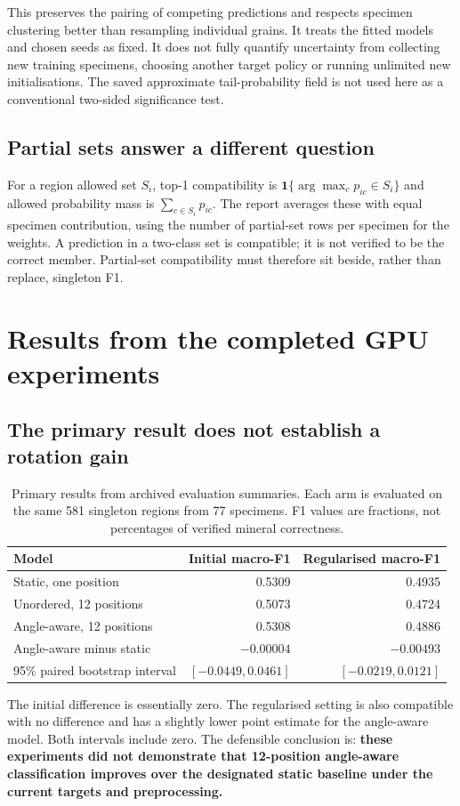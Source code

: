 This preserves the pairing of competing predictions and respects specimen clustering better than resampling individual grains. It treats the fitted models and chosen seeds as fixed. It does not fully quantify uncertainty from collecting new training specimens, choosing another target policy or running unlimited new initialisations. The saved approximate tail-probability field is not used here as a conventional two-sided significance test.

\subsection{Partial sets answer a different question}
For a region allowed set $S_i$, top-1 compatibility is $\mathbf1\{\arg\max_cp_{ic}\in S_i\}$ and allowed probability mass is $\sum_{c\in S_i}p_{ic}$. The report averages these with equal specimen contribution, using the number of partial-set rows per specimen for the weights. A prediction in a two-class set is compatible; it is not verified to be the correct member. Partial-set compatibility must therefore sit beside, rather than replace, singleton F1.

\section{Results from the completed GPU experiments}
\subsection{The primary result does not establish a rotation gain}
\begin{table}[htbp]\centering
\begin{tabular}{@{}lrr@{}}\toprule Model & Initial macro-F1 & Regularised macro-F1\\\midrule
Static, one position & 0.5309 & 0.4935\\
Unordered, 12 positions & 0.5073 & 0.4724\\
Angle-aware, 12 positions & 0.5308 & 0.4886\\\midrule
Angle-aware minus static & $-0.00004$ & $-0.00493$\\
95\% paired bootstrap interval & $[-0.0449,0.0461]$ & $[-0.0219,0.0121]$\\\bottomrule
\end{tabular}
\caption{Primary results from archived evaluation summaries. Each arm is evaluated on the same 581 singleton regions from 77 specimens. F1 values are fractions, not percentages of verified mineral correctness.}
\end{table}
The initial difference is essentially zero. The regularised setting is also compatible with no difference and has a slightly lower point estimate for the angle-aware model. Both intervals include zero. The defensible conclusion is: \textbf{these experiments did not demonstrate that 12-position angle-aware classification improves over the designated static baseline under the current targets and preprocessing.}

